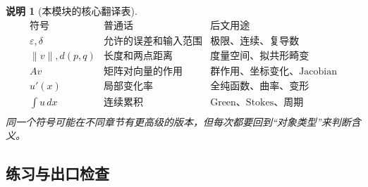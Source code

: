 \documentclass[UTF8,fontset=none,a4paper,11pt]{ctexart}
\theoremstyle{foundation-definition}
\theoremstyle{foundation-theorem}
\theoremstyle{foundation-proposition}
\theoremstyle{foundation-example}
\theoremstyle{foundation-remark}
\newtheorem{remark}[definition]{说明}
\theoremstyle{foundation-theorem}
\begin{document}
\begin{remark}[本模块的核心翻译表]
\[
\begin{array}{c|c|c}
\text{符号} & \text{普通话} & \text{后文用途}\\
\hline
\varepsilon,\delta & \text{允许的误差和输入范围} & \text{极限、连续、复导数}\\
\|v\|,d(p,q) & \text{长度和两点距离} & \text{度量空间、拟共形畸变}\\
A v & \text{矩阵对向量的作用} & \text{群作用、坐标变化、Jacobian}\\
u'(x) & \text{局部变化率} & \text{全纯函数、曲率、变形}\\
\int u\,dx & \text{连续累积} & \text{Green、Stokes、周期}\\
\end{array}
\]
同一个符号可能在不同章节有更高级的版本，但每次都要回到“对象类型”来判断含义。
\end{remark}

\subsection{练习与出口检查}
\end{document}
